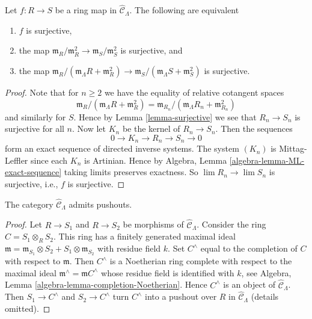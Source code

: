 \begin{lemma}
\label{lemma-surjective-cotangent-space}
Let $f: R \to S$ be a ring map in $\widehat{\mathcal{C}}_\Lambda$.
The following are equivalent
\begin{enumerate}
\item $f$ is surjective,
\item the map
$\mathfrak m_R/\mathfrak m_R^2 \to \mathfrak m_S/\mathfrak m_S^2$
is surjective, and
\item the map
$\mathfrak m_R/(\mathfrak m_\Lambda R + \mathfrak m_R^2) \to
\mathfrak m_S/(\mathfrak m_\Lambda S + \mathfrak m_S^2)$
is surjective.
\end{enumerate}
\end{lemma}

\begin{proof}
Note that for $n \geq 2$ we have the equality of relative cotangent spaces
$$
\mathfrak m_R/(\mathfrak m_\Lambda R + \mathfrak m_R^2)
=
\mathfrak m_{R_n}/(\mathfrak m_\Lambda R_n + \mathfrak m_{R_n}^2)
$$
and similarly for $S$. Hence by
Lemma \ref{lemma-surjective}
we see that $R_n \to S_n$ is surjective for all $n$.
Now let $K_n$ be the kernel of $R_n \to S_n$.  Then the sequences
$$
0 \to K_n \to R_n \to S_n \to 0
$$
form an exact sequence of directed inverse systems. The system $(K_n)$ is
Mittag-Leffler since each $K_n$ is Artinian. Hence by
Algebra, Lemma \ref{algebra-lemma-ML-exact-sequence}
taking limits preserves exactness. So
$\lim R_n \to \lim S_n$ is surjective, i.e., $f$ is surjective.
\end{proof}

\begin{lemma}
\label{lemma-CLambdahat-pushouts}
The category $\widehat{\mathcal{C}}_\Lambda$ admits pushouts.
\end{lemma}

\begin{proof}
Let $R \to S_1$ and $R \to S_2$ be morphisms of
$\widehat{\mathcal{C}}_\Lambda$. Consider the ring
$C = S_1 \otimes_R S_2$.
This ring has a finitely generated maximal ideal
$\mathfrak m = \mathfrak m_{S_1} \otimes S_2 +
S_1 \otimes \mathfrak m_{S_2}$ with residue field $k$.
Set $C^\wedge$ equal to the completion of $C$ with respect to $\mathfrak m$.
Then $C^\wedge$ is a Noetherian ring complete with respect to
the maximal ideal $\mathfrak m^\wedge = \mathfrak mC^\wedge$
whose residue field is identified with $k$, see
Algebra, Lemma \ref{algebra-lemma-completion-Noetherian}.
Hence $C^\wedge$ is an object of $\widehat{\mathcal{C}}_\Lambda$.
Then $S_1 \to C^\wedge$ and $S_2 \to C^\wedge$ turn $C^\wedge$
into a pushout over $R$ in $\widehat{\mathcal{C}}_\Lambda$ (details omitted).
\end{proof}


